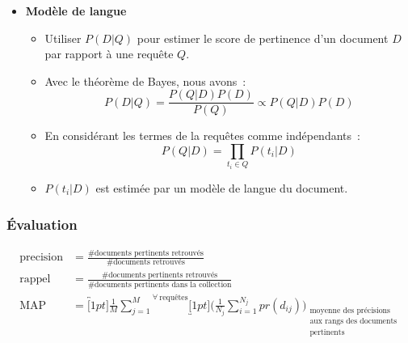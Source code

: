 \documentclass[12pt,aspectratio=43,dvipsnames,table]{beamer}
\begin{document}
\begin{frame}[allowframebreaks]
\begin{itemize}
        \item \textbf{Modèle de langue}~\cite{DBLP:conf/sigir/PonteC98}
        \begin{itemize}
            \item Utiliser $P(D|Q)$ pour estimer le score de pertinence d'un 
                  document $D$ par rapport à une requête $Q$.
            \item Avec le théorème de Bayes, nous avons~:
            \begin{equation*}
              P(D|Q) = \frac{P(Q|D)P(D)}{P(Q)} \propto P(Q|D)P(D)
            \end{equation*}
            \item En considérant les termes de la requêtes comme indépendants~:
            \begin{equation*}
              P(Q|D) = \prod_{t_i \in Q} P(t_i | D)
            \end{equation*}
            \item $P(t_i | D)$ est estimée par un modèle de langue du document.
        \end{itemize}

    \end{itemize}
\end{frame}


\begin{frame}
    \frametitle{\'Evaluation}

    \begin{align*}
    \text{precision} & = \frac{\text{\# documents pertinents retrouvés}}
                              {\text{\# documents retrouvés}}
                              \\[1.5em]
    \text{rappel} & = \frac{\text{\# documents pertinents retrouvés}}
                           {\text{\# documents pertinents dans la collection}}
                           \\[1.5em]
    \text{MAP} & = \overbracket[1pt]{
                      \frac{1}{M} \sum_{j=1}^{M}
                   }^{\forall~\text{requêtes}} 
                   \underbracket[1pt]{
                    \Bigg( \frac{1}{N_j} \sum_{i=1}^{N_j} pr(d_{ij}) \Bigg)
                   }_{
                      \substack{
                        \text{moyenne des précisions} \\ 
                        \text{aux rangs des documents} \\ 
                        \text{pertinents}
                      }
                    }
    \end{align*}

\end{frame}
\end{document}
